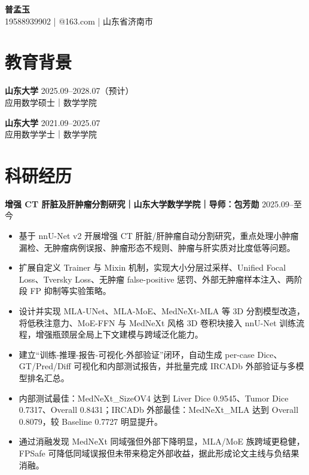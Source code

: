 \documentclass[10pt,a4paper]{ctexart}
\newcommand{\entry}[4]{
  \textbf{#1} \hfill #2\\
  #3 \hfill #4
}
\newcommand{\role}[2]{
  \textbf{#1} \hfill #2
}
\begin{document}
\small

\begin{center}
  {\fontsize{20pt}{22pt}\selectfont \textbf{普孟玉}}\\[2pt]
  19588939902 \quad | @163.com \quad | \quad 山东省济南市
\end{center}

\section{教育背景}
\entry{山东大学}{2025.09--2028.07（预计）}{应用数学硕士｜数学学院}{}
\vspace{2pt}
\entry{山东大学}{2021.09--2025.07}{应用数学学士｜数学学院}{}

\section{科研经历}
\role{增强 CT 肝脏及肝肿瘤分割研究｜山东大学数学学院｜导师：包芳勋}{2025.09--至今}
\begin{itemize}
  \item 基于 nnU-Net v2 开展增强 CT 肝脏/肝肿瘤自动分割研究，重点处理小肿瘤漏检、无肿瘤病例误报、肿瘤形态不规则、肿瘤与肝实质对比度低等问题。
  \item 扩展自定义 Trainer 与 Mixin 机制，实现大小分层过采样、Unified Focal Loss、Tversky Loss、无肿瘤 false-positive 惩罚、外部无肿瘤样本注入、两阶段 FP 抑制等实验策略。
  \item 设计并实现 MLA-UNet、MLA-MoE、MedNeXt-MLA 等 3D 分割模型改造，将低秩注意力、MoE-FFN 与 MedNeXt 风格 3D 卷积块接入 nnU-Net 训练流程，增强瓶颈层全局上下文建模与跨域泛化能力。
  \item 建立“训练-推理-报告-可视化-外部验证”闭环，自动生成 per-case Dice、GT/Pred/Diff 可视化和内部测试报告，并批量完成 IRCADb 外部验证与多模型排名汇总。
  \item 内部测试最佳：MedNeXt\_SizeOV4 达到 Liver Dice 0.9545、Tumor Dice 0.7317、Overall 0.8431；IRCADb 外部最佳：MedNeXt\_MLA 达到 Overall 0.8079，较 Baseline 0.7727 明显提升。
  \item 通过消融发现 MedNeXt 同域强但外部下降明显，MLA/MoE 族跨域更稳健，FPSafe 可降低同域误报但未带来稳定外部收益，据此形成论文主线与负结果消融。
\end{itemize}
\end{document}
